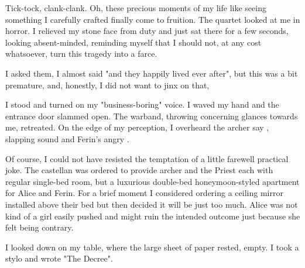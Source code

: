Tick-tock, clank-clank. Oh, these precious moments of my life like seeing something I carefully crafted finally come to fruition. The quartet looked at me in horror. I relieved my stone face from duty and just sat there for a few seconds, looking absent-minded, reminding myself that I should not, at any cost whatsoever, turn this tragedy into a farce.

 I asked them,  I almost said "and they happily lived ever after", but this was a bit premature, and, honestly, I did not want to jinx on that, 

I stood and turned on my "business-boring" voice.  I waved my hand and the entrance door slammed open. The warband, throwing concerning glances towards me, retreated. On the edge of my perception, I overheard the archer say , slapping sound and Ferin's angry .

Of course, I could not have resisted the temptation of a little farewell practical joke. The castellan was ordered to provide archer and the Priest each with regular single-bed room, but a luxurious double-bed honeymoon-styled apartment for Alice and Ferin. For a brief moment I considered ordering a ceiling mirror installed above their bed but then decided it will be just too much. Alice was not kind of a girl easily pushed and might ruin the intended outcome just because she felt being contrary.

I looked down on my table, where the large sheet of paper rested, empty. I took a stylo and wrote "The Decree".

